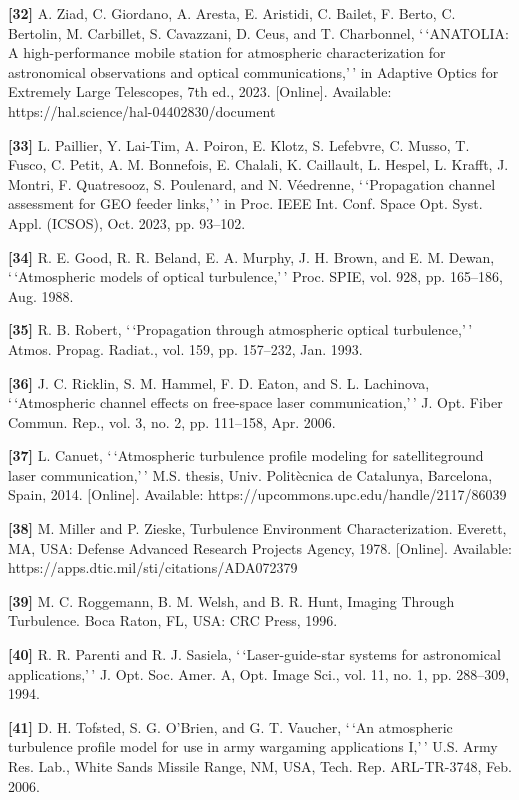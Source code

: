 \documentclass[
]{article}
\begin{document}
\textbf{{[}32{]}} A. Ziad, C. Giordano, A. Aresta, E. Aristidi, C.
Bailet, F. Berto, C. Bertolin, M. Carbillet, S. Cavazzani, D. Ceus, and
T. Charbonnel, `\,`ANATOLIA: A high-performance mobile station for
atmospheric characterization for astronomical observations and optical
communications,'\,' in Adaptive Optics for Extremely Large Telescopes,
7th ed., 2023. {[}Online{]}. Available:
https://hal.science/hal-04402830/document

\textbf{{[}33{]}} L. Paillier, Y. Lai-Tim, A. Poiron, E. Klotz, S.
Lefebvre, C. Musso, T. Fusco, C. Petit, A. M. Bonnefois, E. Chalali, K.
Caillault, L. Hespel, L. Krafft, J. Montri, F. Quatresooz, S. Poulenard,
and N. Véedrenne, `\,`Propagation channel assessment for GEO feeder
links,'\,' in Proc. IEEE Int. Conf. Space Opt. Syst. Appl. (ICSOS), Oct.
2023, pp. 93--102.

\textbf{{[}34{]}} R. E. Good, R. R. Beland, E. A. Murphy, J. H. Brown,
and E. M. Dewan, `\,`Atmospheric models of optical turbulence,'\,' Proc.
SPIE, vol. 928, pp. 165--186, Aug. 1988.

\textbf{{[}35{]}} R. B. Robert, `\,`Propagation through atmospheric
optical turbulence,'\,' Atmos. Propag. Radiat., vol. 159, pp. 157--232,
Jan. 1993.

\textbf{{[}36{]}} J. C. Ricklin, S. M. Hammel, F. D. Eaton, and S. L.
Lachinova, `\,`Atmospheric channel effects on free-space laser
communication,'\,' J. Opt. Fiber Commun. Rep., vol. 3, no. 2, pp.
111--158, Apr. 2006.

\textbf{{[}37{]}} L. Canuet, `\,`Atmospheric turbulence profile modeling
for satelliteground laser communication,'\,' M.S. thesis, Univ.
Politècnica de Catalunya, Barcelona, Spain, 2014. {[}Online{]}.
Available: https://upcommons.upc.edu/handle/2117/86039

\textbf{{[}38{]}} M. Miller and P. Zieske, Turbulence Environment
Characterization. Everett, MA, USA: Defense Advanced Research Projects
Agency, 1978. {[}Online{]}. Available:
https://apps.dtic.mil/sti/citations/ADA072379

\textbf{{[}39{]}} M. C. Roggemann, B. M. Welsh, and B. R. Hunt, Imaging
Through Turbulence. Boca Raton, FL, USA: CRC Press, 1996.

\textbf{{[}40{]}} R. R. Parenti and R. J. Sasiela, `\,`Laser-guide-star
systems for astronomical applications,'\,' J. Opt. Soc. Amer. A, Opt.
Image Sci., vol. 11, no. 1, pp. 288--309, 1994.

\textbf{{[}41{]}} D. H. Tofsted, S. G. O'Brien, and G. T. Vaucher,
`\,`An atmospheric turbulence profile model for use in army wargaming
applications I,'\,' U.S. Army Res. Lab., White Sands Missile Range, NM,
USA, Tech. Rep. ARL-TR-3748, Feb. 2006.
\end{document}
